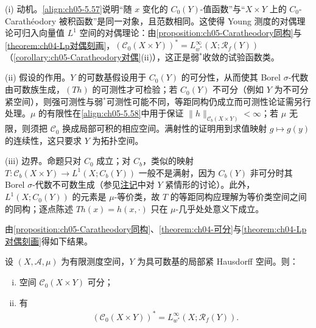 \documentclass[../../main.tex]{subfiles}%
\begin{document}
\begin{remark}\label{remark:ch05-Caratheodory同构动机}
(i) 动机。\eqref{align:ch05-5.57}说明“随 $x$ 变化的 $C_0(Y)$-值函数”与“$X\times Y$ 上的 $C_0$-Carathéodory 被积函数”是同一对象，且范数相同。这使得 Young 测度的对偶理论可归入向量值 $L^1$ 空间的对偶理论：由\cref{proposition:ch05-Caratheodory同构}与\cref{theorem:ch04-Lp对偶刻画}，$(\mathcal{C}_0(X\times Y))^*=L^\infty_{w^*}(X;\mathscr{R}_f(Y))$（\cref{corollary:ch05-Caratheodory对偶}(ii)），这正是弱$^*$收敛的试验函数类。

(ii) 假设的作用。$Y$ 的可数基假设用于 $C_0(Y)$ 的可分性，从而使其 Borel $\sigma$-代数由可数族生成，$(Th)$ 的可测性才可检验；若 $C_0(Y)$ 不可分（例如 $Y$ 为不可分紧空间），则强可测性与弱$^*$可测性可能不同，等距同构仍成立而可测性论证需另行处理。$\mu$ 的有限性在\eqref{align:ch05-5.58}中用于保证 $\|h\|_{\mathcal{C}_b(X\times Y)}<\infty$；若 $\mu$ 无限，则须把 $\mathcal{C}_0$ 换成局部可积的相应空间。满射性的证明用到求值映射 $g\mapsto g(y)$ 的连续性，这只要求 $Y$ 为拓扑空间。

(iii) 边界。命题只对 $C_0$ 成立；对 $C_b$，类似的映射 $T:\mathcal{C}_b(X\times Y)\to L^1(X;C_b(Y))$ 一般不是满射，因为 $C_b(Y)$ 非可分时其 Borel $\sigma$-代数不可数生成（参见\hyperref[remark:ch05-紧空间同构]{注记}中对 $Y$ 紧情形的讨论）。此外，$L^1(X;C_0(Y))$ 的元素是 $\mu$-等价类，故 $T$ 的等距同构应理解为等价类空间之间的同构；逐点陈述 $T h(x)=h(x,\cdot)$ 只在 $\mu$-几乎处处意义下成立。
\end{remark}

由\cref{proposition:ch05-Caratheodory同构}、\cref{theorem:ch04-可分}与\cref{theorem:ch04-Lp对偶刻画}得如下结果。

\begin{corollary}\label{corollary:ch05-Caratheodory对偶}
设 $(X,\mathcal{A},\mu)$ 为有限测度空间，$Y$ 为具可数基的局部紧 Hausdorff 空间。则：
\begin{enumerate}[(i)]
\item\label{item:ch05-cd-i} 空间 $\mathcal{C}_0(X\times Y)$ 可分；
\item\label{item:ch05-cd-ii} 有
\begin{align}
(\mathcal{C}_0(X\times Y))^*=L^\infty_{w^*}(X;\mathscr{R}_f(Y)).\label{align:ch05-5.58a}
\end{align}
\end{enumerate}
\end{corollary}
\end{document}
